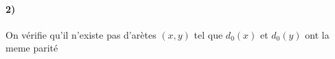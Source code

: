 \paragraph{2)} On vérifie qu'il n'existe pas d'arètes $(x,y)$ tel que $d_0(x)$ et $d_0(y)$ ont la meme parité



% 
% 
% 

